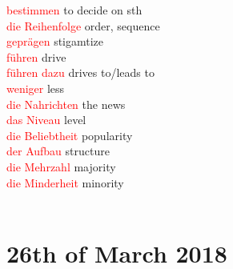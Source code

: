 \documentclass{article}
\begin{document}
\begin{multicols}{2}
	\textcolor{red}{bestimmen} to decide on sth\\ 
	\textcolor{red}{die Reihenfolge} order, sequence \\ 
	\textcolor{red}{geprägen} stigamtize\\
	\textcolor{red}{führen} drive\\
	\textcolor{red}{führen dazu} drives to/leads to\\
	\textcolor{red}{weniger} less\\
	\textcolor{red}{die Nahrichten} the news \\
	\textcolor{red}{das Niveau} level \\
	\textcolor{red}{die Beliebtheit} popularity\\
	\textcolor{red}{der Aufbau} structure \\
	\textcolor{red}{die Mehrzahl} majority\\
	\textcolor{red}{die Minderheit} minority\\\\
	
	\section*{26th of March 2018}
	

\end{multicols}
\end{document}
